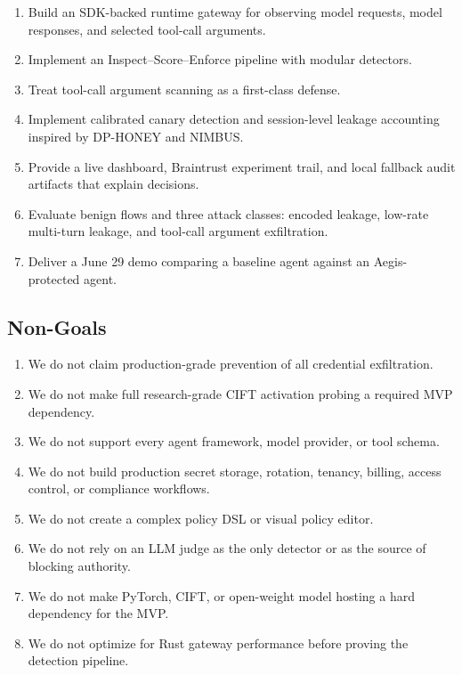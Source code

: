 \documentclass[11pt,letterpaper]{article}
\begin{document}
\begin{enumerate}
    \item Build an SDK-backed runtime gateway for observing model requests, model responses, and selected tool-call arguments.
    \item Implement an Inspect--Score--Enforce pipeline with modular detectors.
    \item Treat tool-call argument scanning as a first-class defense.
    \item Implement calibrated canary detection and session-level leakage accounting inspired by DP-HONEY and NIMBUS.
    \item Provide a live dashboard, Braintrust experiment trail, and local fallback audit artifacts that explain decisions.
    \item Evaluate benign flows and three attack classes: encoded leakage, low-rate multi-turn leakage, and tool-call argument exfiltration.
    \item Deliver a June 29 demo comparing a baseline agent against an Aegis-protected agent.
\end{enumerate}

\subsection{Non-Goals}

\begin{enumerate}
    \item We do not claim production-grade prevention of all credential exfiltration.
    \item We do not make full research-grade CIFT activation probing a required MVP dependency.
    \item We do not support every agent framework, model provider, or tool schema.
    \item We do not build production secret storage, rotation, tenancy, billing, access control, or compliance workflows.
    \item We do not create a complex policy DSL or visual policy editor.
    \item We do not rely on an LLM judge as the only detector or as the source of blocking authority.
    \item We do not make PyTorch, CIFT, or open-weight model hosting a hard dependency for the MVP.
    \item We do not optimize for Rust gateway performance before proving the detection pipeline.
\end{enumerate}
\end{document}
